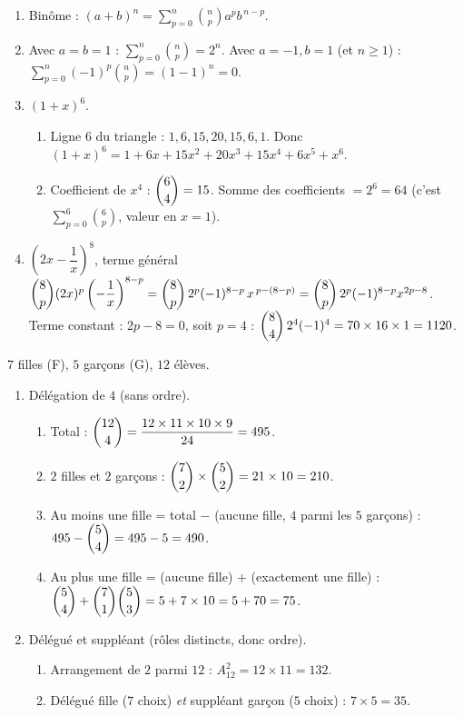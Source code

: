 \begin{enumerate}[label=\arabic*)]
\item Binôme : $\displaystyle (a+b)^{n}=\sum_{p=0}^{n}\binom np a^{p}b^{\,n-p}$.
\item Avec $a=b=1$ : $\displaystyle\sum_{p=0}^{n}\binom np=2^{n}$. Avec $a=-1,b=1$ (et $n\ge1$) :
$\displaystyle\sum_{p=0}^{n}(-1)^{p}\binom np=(1-1)^{n}=0$.
\item $(1+x)^{6}$.
\begin{enumerate}[label=\alph*)]
\item Ligne $6$ du triangle : $1,6,15,20,15,6,1$. Donc
$(1+x)^{6}=1+6x+15x^{2}+20x^{3}+15x^{4}+6x^{5}+x^{6}$.
\item Coefficient de $x^{4}$ : $\dbinom64=15$. Somme des coefficients $=2^{6}=64$
(c'est $\sum_{p=0}^{6}\binom6p$, valeur en $x=1$).
\end{enumerate}
\item $\left(2x-\dfrac1x\right)^{8}$, terme général
$\dbinom8p(2x)^{p}\left(-\dfrac1x\right)^{8-p}=\dbinom8p\,2^{p}(-1)^{8-p}\,x^{\,p-(8-p)}
=\dbinom8p\,2^{p}(-1)^{8-p}x^{2p-8}$.
Terme constant : $2p-8=0$, soit $p=4$ :
$\dbinom84\,2^{4}(-1)^{4}=70\times16\times1=1120$.
\end{enumerate}

$7$ filles (F), $5$ garçons (G), $12$ élèves.
\begin{enumerate}[label=\arabic*)]
\item Délégation de $4$ (sans ordre).
\begin{enumerate}[label=\alph*)]
\item Total : $\dbinom{12}{4}=\dfrac{12\times11\times10\times9}{24}=495$.
\item $2$ filles et $2$ garçons : $\dbinom72\times\dbinom52=21\times10=210$.
\item Au moins une fille = total $-$ (aucune fille, $4$ parmi les $5$ garçons) :
$495-\dbinom54=495-5=490$.
\item Au plus une fille = (aucune fille) $+$ (exactement une fille) :
$\dbinom54+\dbinom71\dbinom53=5+7\times10=5+70=75$.
\end{enumerate}
\item Délégué et suppléant (rôles distincts, donc ordre).
\begin{enumerate}[label=\alph*)]
\item Arrangement de $2$ parmi $12$ : $A_{12}^{2}=12\times11=132$.
\item Délégué fille ($7$ choix) \emph{et} suppléant garçon ($5$ choix) : $7\times5=35$.
\end{enumerate}
\end{enumerate}
